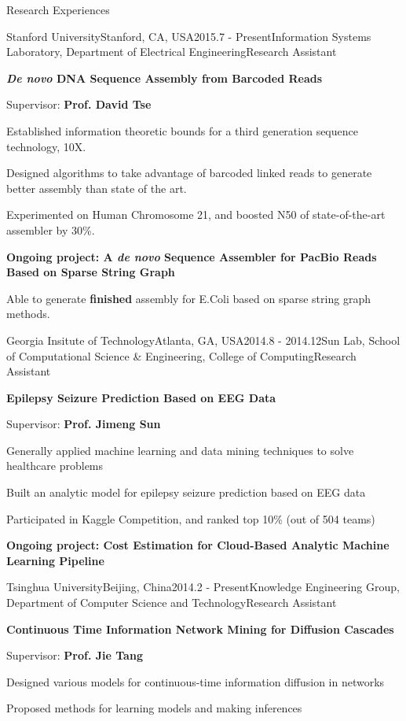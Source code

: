 \documentclass{resume} %
\begin{document}
\begin{rSection}{Research Experiences}

\begin{rSubsection}{Stanford University}{Stanford, CA, USA}{2015.7 - Present}{Information Systems Laboratory, Department of Electrical Engineering}{Research Assistant}
\item  {\bf {\it De novo} DNA Sequence Assembly from Barcoded Reads}
\item Supervisor: {\bf Prof. David Tse}
\item Established information theoretic bounds for a third generation sequence technology, 10X. 
\item Designed algorithms to take advantage of barcoded linked reads to generate better assembly than state of the art. 
\item Experimented on Human Chromosome 21, and boosted N50 of state-of-the-art assembler by 30\%.
\item {\bf Ongoing project: A {\it de novo} Sequence Assembler for PacBio Reads Based on Sparse String Graph}
\item Able to generate {\bf finished} assembly for E.Coli based on sparse string graph methods.
\end{rSubsection}


\begin{rSubsection}{Georgia Insitute of Technology}{Atlanta, GA, USA}{2014.8 - 2014.12}{Sun Lab, School of Computational Science \& Engineering,  College of Computing}{Research Assistant}
\item  {\bf Epilepsy Seizure Prediction Based on EEG Data}
\item Supervisor: {\bf Prof. Jimeng Sun}
\item Generally applied machine learning and data mining techniques to solve healthcare problems
\item Built an analytic model for epilepsy seizure prediction based on EEG data
\item Participated in Kaggle Competition, and ranked top 10\% (out of 504 teams)   
\item {\bf Ongoing project: Cost Estimation for Cloud-Based Analytic Machine Learning Pipeline }
\end{rSubsection}



\begin{rSubsection}{Tsinghua University}{Beijing, China}{2014.2 - Present}{Knowledge Engineering Group, Department of Computer Science and Technology}{Research Assistant}
\item {\bf Continuous Time Information Network Mining for Diffusion Cascades}
\item Supervisor: {\bf Prof. Jie Tang}
\item Designed various models for continuous-time information diffusion in networks 
\item Proposed methods for learning models and making inferences
\end{rSubsection}




\end{rSection}
\end{document}
